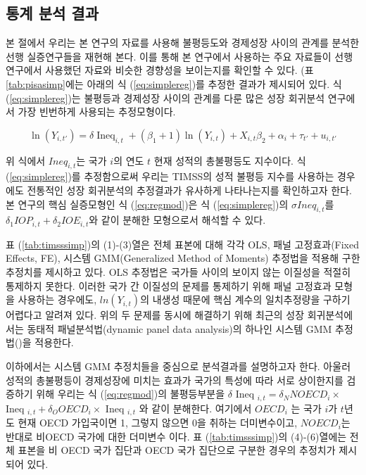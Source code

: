 \subsection{통계 분석 결과}
본 절에서 우리는 본 연구의 자료를 사용해 불평등도와 경제성장 사이의 관계를 분석한 선행 실증연구들을 재현해 본다. 이를 통해 본 연구에서 사용하는 주요 자료들이 선행 연구에서 사용했던 자료와 비슷한 경향성을 보이는지를 확인할 수 있다. 
(표\ref{tab:pisasimp}에는 아래의 식 (\ref{eq:simplereg})를 추정한 결과가 제시되어 있다. 식 (\ref{eq:simplereg})는 불평등과 경제성장 사이의 관계를 다룬 많은 성장 회귀분석 연구에서 가장 빈번하게 사용되는 추정모형이다.

\begin{equation}
\label{eq:simplereg}
\ln \left(Y_{i, t'}\right)=\delta \operatorname{Ineq}_{i, t}+\left(\beta_{1}+1\right) \ln \left(Y_{i, t}\right)+X_{i, t} \beta_{2}+\alpha_{i}+\tau_{t'}+u_{i, t'}
\end{equation}

위 식에서 $Ineq_{i,t}$는 국가 $i$의 연도 $t$ 현재 성적의 총불평등도 지수이다.
 식 (\ref{eq:simplereg})를 추정함으로써 우리는 TIMSS의 성적 불평등 지수를 사용하는 경우에도 전통적인 성장 회귀분석의 추정결과가 유사하게 나타나는지를 확인하고자 한다.
 본 연구의 핵심 실증모형인 식 (\ref{eq:regmod})은 식 (\ref{eq:simplereg})의 $\sigma Ineq_{i,t}$를 $\delta_{1} I O P_{i, t}+\delta_{2} I O E_{i, t}$와 같이 분해한 모형으로서 해석할 수 있다.
 
표 (\ref{tab:timsssimp})의 (1)-(3)열은 전체 표본에 대해 각각 OLS, 패널 고정효과(Fixed Effects, FE), 시스템 GMM(Generalized Method of Moments) 추정법을 적용해 구한 추정치를 제시하고 있다.
OLS 추정법은 국가들 사이의 보이지 않는 이질성을 적절히 통제하지 못한다.
 이러한 국가 간 이질성의 문제를 통제하기 위해 패널 고정효과 모형을 사용하는 경우에도, $ln(Y_{i,t})$의 내생성 때문에 핵심 계수의 일치추정량을 구하기 어렵다고 알려져 있다.
위의 두 문제를 동시에 해결하기 위해 최근의 성장 회귀분석에서는 동태적 패널분석법(dynamic panel data analysis)의 하나인 시스템 GMM 추정법(\cite{bnb98})을 적용한다.

이하에서는 시스템 GMM 추정치들을 중심으로 분석결과를 설명하고자 한다.
아울러 성적의 총불평등이 경제성장에 미치는 효과가 국가의 특성에 따라 서로 상이한지를 검증하기 위해 우리는 식 (\ref{eq:regmod})의 불평등부분을 $\delta$ Ineq $_{i, t}=\delta_{N} N O E C D_{i} \times$ Ineq $_{i, t}+\delta_{O} O E C D_{i} \times$ Ineq $_{i, t}$ 와 같이 분해한다.
여기에서 $OECD_i$ 는 국가 $i$가 $t$년도 현재 OECD 가입국이면 1, 그렇지 않으면 0을 취하는 더미변수이고, $NOECD_i$는 반대로 비OECD 국가에 대한 더미변수 이다.
표 (\ref{tab:timsssimp})의 (4)-(6)열에는 전체 표본을 비 OECD 국가 집단과 OECD 국가 집단으로 구분한 경우의 추정치가 제시되어 있다.  

